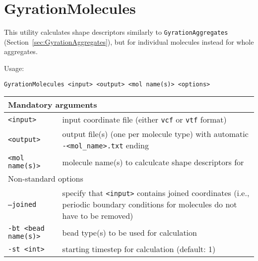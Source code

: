 \section{GyrationMolecules} \label{sec:GyrationMolecules}

This utility calculates shape descriptors similarly to
\texttt{GyrationAggregates} (Section~\ref{sec:GyrationAggregates}), but for
individual molecules instead for whole aggregates.

Usage:

\vspace{1em}
\noindent
\texttt{GyrationMolecules <input> <output> <mol name(s)> <options>}

\noindent
\begin{longtable}{p{}p{}}
  \toprule
  \multicolumn{2}{l}{Mandatory arguments} \\
  \midrule
  \texttt{<input>} & input coordinate file (either \texttt{vcf} or
    \texttt{vtf} format) \\
  \texttt{<output>} & output file(s) (one per molecule type) with
    automatic \texttt{-<mol\_name>.txt} ending \\
  \texttt{<mol name(s)>} & molecule name(s) to calculcate shape descriptors for \\
  \toprule
  \multicolumn{2}{l}{Non-standard options} \\
  \midrule
  \texttt{--joined} & specify that \texttt{<input>} contains joined
    coordinates (i.e., periodic boundary conditions for molecules do not
    have to be removed) \\
  \texttt{-bt <bead name(s)>} & bead type(s) to be used for calculation \\
  \texttt{-st <int>} & starting timestep for calculation (default: 1) \\
  \bottomrule
\end{longtable}

